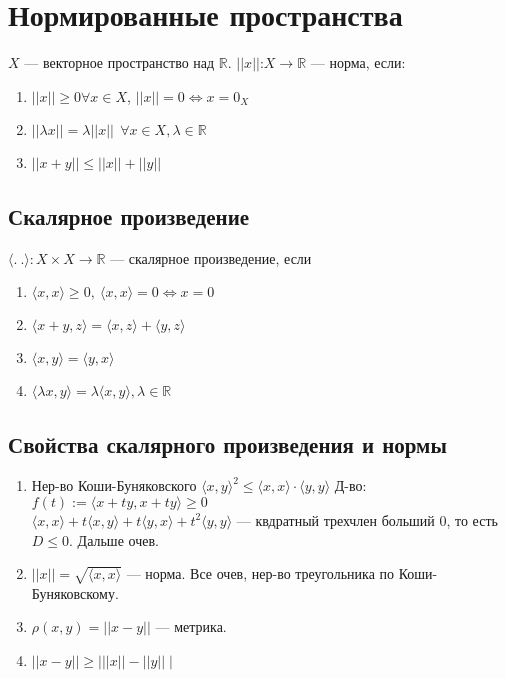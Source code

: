 \documentclass[12pt]{report} %
\begin{document}
\section*{Нормированные пространства}
$X$ --- векторное пространство над $\mathbb{R}$.
$||x||$:$X \rightarrow \mathbb{R}$ --- 	норма, если:
\begin{enumerate}
\item $||x|| \geqslant 0 \forall x \in X$, $||x|| = 0 \Leftrightarrow x = 0_{X}$
\item $||\lambda x|| = \lambda||x|| \ \ \forall x \in X, \lambda \in \mathbb{R}$
\item $||x + y|| \leqslant ||x|| + ||y||$
\end{enumerate}
\subsection*{Скалярное произведение}
$\langle . \ . \rangle: X \times X \rightarrow \mathbb{R}$
--- скалярное произведение, если
\begin{enumerate}
\item $\langle x, x \rangle \geqslant 0, \ \langle x, x \rangle = 0 \Leftrightarrow x = 0$
\item $\langle x + y, z \rangle = \langle x, z \rangle + \langle y, z \rangle$
\item $\langle x, y \rangle = \langle y, x \rangle$
\item $\langle \lambda x, y \rangle = \lambda \langle x, y \rangle, \lambda \in \mathbb{R}$
\end{enumerate}

\subsection*{Свойства скалярного произведения и нормы}
\begin{enumerate}
\item Нер-во Коши-Буняковского $\langle x, y \rangle ^2 \leqslant \langle x, x \rangle \cdot \langle y, y \rangle$
Д-во:\\
$f(t) := \langle x + ty, x + ty \rangle \geqslant 0$\\
$\langle x, x \rangle + t\langle x, y \rangle + t\langle y, x \rangle + t^2 \langle y, y \rangle$ --- квдратный трехчлен больший 0, то есть $D \leqslant 0$. Дальше очев.
\item $||x|| = \sqrt{\langle x, x \rangle}$ --- норма. Все очев, нер-во треугольника по Коши-Буняковскому.
\item $\rho(x, y) = ||x - y||$ --- метрика. 
\item $||x - y|| \geqslant \mid ||x|| - ||y|| \mid$
\end{enumerate}
\end{document}
